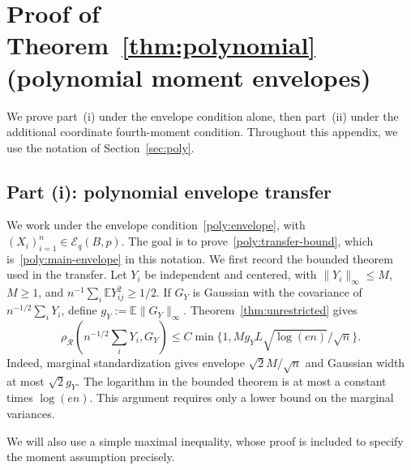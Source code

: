 \documentclass[11pt,letterpaper]{article}
\newenvironment{vSixBlock}{\color{magenta}}{}
\theoremstyle{remark}
\newcommand{\E}{\mathbb E}
\newcommand{\rh}{\rho_{\mathcal R}}
\begin{document}
\section{\texorpdfstring{{Proof of Theorem~\ref*{thm:polynomial} (polynomial moment envelopes)}}{Proof of Theorem 2 (polynomial moment envelopes)}}\label{app:polynomial-proof}

{We prove part~\textup{(i)} under the envelope
condition alone, then part~\textup{(ii)} under the additional
coordinate fourth-moment condition. Throughout this appendix, we use
the notation of Section~\ref{sec:poly}.}

\subsection{\texorpdfstring{{Part (i): polynomial envelope transfer}}{Part (i): polynomial envelope transfer}}\label{app:conditional}

{We work under the envelope
condition~\eqref{poly:envelope}, with
\((X_i)_{i=1}^n\in\mathcal E_q(B,p)\). The goal is to
prove~\eqref{poly:transfer-bound}, which is~\eqref{poly:main-envelope}
in this notation.}
\begin{vSixBlock}
We first record the bounded theorem used in the transfer.
Let \(Y_i\) be independent and centered, with
\(\|Y_i\|_\infty\le M\), \(M\ge1\), and
\(n^{-1}\sum_i\E Y_{ij}^2\ge1/2\). If \(G_Y\) is Gaussian with
the covariance of \(n^{-1/2}\sum_iY_i\), define
\(g_Y:=\E\|G_Y\|_\infty\). Theorem~\ref{thm:unrestricted} gives
\begin{equation}
 \rh\left(n^{-1/2}\sum_iY_i,G_Y\right)
 \le C\min\{1,Mg_YL\sqrt{\log(en)}/\sqrt n\}.
 \label{app:bounded-input}
\end{equation}
Indeed, marginal standardization gives envelope
\(\sqrt2M/\sqrt n\) and Gaussian width at most \(\sqrt2g_Y\).
The logarithm in the bounded theorem is at most a constant times
\(\log(en)\). This argument requires only a lower bound on the
marginal variances.
\end{vSixBlock}

We will also use a simple maximal inequality, whose proof is included
to specify the moment assumption precisely.
\end{document}
